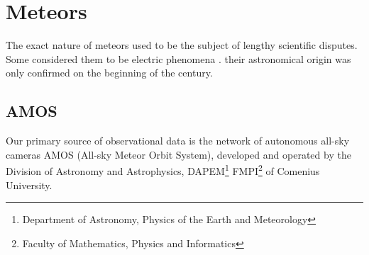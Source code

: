 
\section{Meteors} \label{il}
    The exact nature of meteors used to be the subject of lengthy scientific disputes.
    Some considered them to be electric phenomena \citep{???}.
    their astronomical origin was only confirmed on the beginning of the  century.



    \subsection{AMOS} \label{ila}
        Our primary source of observational data is the network of autonomous all-sky cameras AMOS (All-sky Meteor Orbit System),
        developed and operated by the Division of Astronomy and Astrophysics,
        DAPEM\footnote{Department of Astronomy, Physics of the Earth and Meteorology}
        FMPI\footnote{Faculty of Mathematics, Physics and Informatics} of Comenius University.

